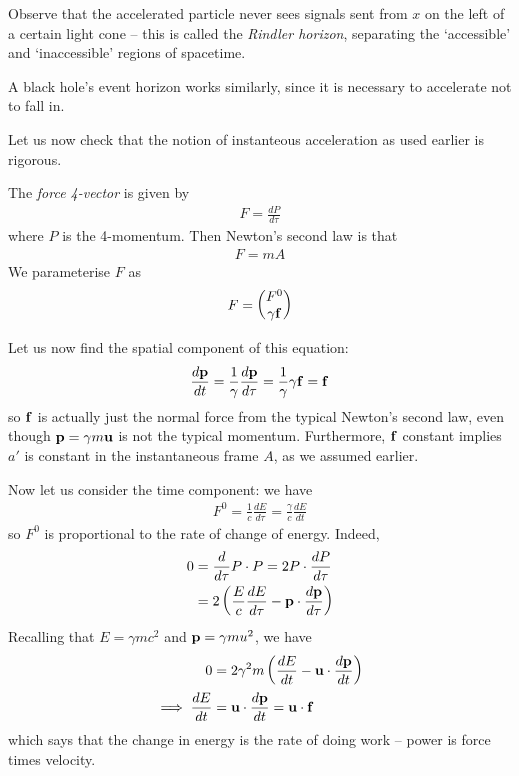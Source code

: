 \documentclass{../../template/note}
\begin{document}
    Observe that the accelerated particle never sees signals sent from \(x\) on the left of a certain light cone -- this is called the \emph{Rindler horizon}, separating the `accessible' and `inaccessible' regions of spacetime.

    \begin{remark*}
        A black hole's event horizon works similarly, since it is necessary to accelerate not to fall in.
    \end{remark*}
    
    Let us now check that the notion of instanteous acceleration as used earlier is rigorous.

    \begin{definition}
        The \emph{force 4-vector} is given by
        \begin{align*}
            F = \frac{dP}{d \tau}
        \end{align*}
        where \(P\) is the 4-momentum. Then Newton's second law is that
        \begin{align*}
            F = mA
        \end{align*}
        We parameterise \(F\) as
        \begin{align*}
            F = \begin{pmatrix}
                F^0 \\
                \gamma \V f \\
            \end{pmatrix}
        \end{align*}
    \end{definition}
    Let us now find the spatial component of this equation:
    \begin{align*}
        \frac{d\V p}{dt} = \frac 1 \gamma \frac{d\V p}{d\tau} = \frac{1}{\gamma} \gamma \V f = \V f
    \end{align*}
    so \(\V f\) is actually just the normal force from the typical Newton's second law, even though \(\V p = \gamma m \V u\) is not the typical momentum. Furthermore, \(\V f\) constant implies \(a'\) is constant in the instantaneous frame \(A\), as we assumed earlier.

    Now let us consider the time component: we have
    \begin{align*}
        F^0 = \frac 1 c \frac{dE}{d\tau} = \frac{\gamma}c \frac{dE}{dt}
    \end{align*}
    so \(F^0\) is proportional to the rate of change of energy. Indeed,
    \begin{align*}
        0 &= \frac{d}{d\tau} P \cdot P = 2P \cdot \frac{dP}{d\tau} \\
        &= 2\left(\frac E c \frac{dE}{d\tau} - \V p \cdot \frac{d\V p}{d\tau}\right)
    \end{align*}
    Recalling that \(E=\gamma mc^2\) and \(\V p = \gamma m u^2\), we have
    \begin{align*}
        0 &= 2\gamma^2 m \left(\frac{dE}{dt}-\V u \cdot \frac{d\V p}{dt}\right) \\
        \implies \frac{dE}{dt} &= \V u \cdot \frac{d\V p}{dt} = \V u \cdot \V f
    \end{align*}
    which says that the change in energy is the rate of doing work -- power is force times velocity.
    
\end{document}
